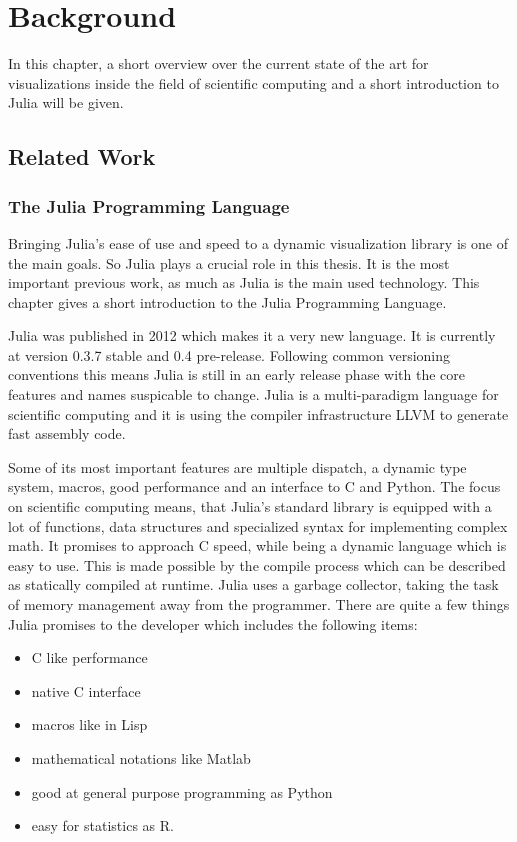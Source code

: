 \section{Background}

In this chapter, a short overview over the current state of the art for visualizations inside the field of scientific computing and a short introduction to Julia will be given.

\subsection{Related Work}

\subsubsection{The Julia Programming Language}

Bringing Julia's ease of use and speed to a dynamic visualization library is one of the main goals.
So Julia plays a crucial role in this thesis. 
It is the most important previous work, as much as Julia is the main used technology.
This chapter gives a short introduction to the Julia Programming Language.

Julia was published in 2012 which makes it a very new language. It is currently at version 0.3.7 stable and 0.4 pre-release.
Following common versioning conventions this means Julia is still in an early release phase with the core features and names suspicable to change.
Julia is a multi-paradigm language for scientific computing and it is using the compiler infrastructure \ac{LLVM} to generate fast assembly code.

Some of its most important features are multiple dispatch, a dynamic type system, macros, good performance and an interface to C and Python.
The focus on scientific computing means, that Julia's standard library is equipped with a lot of functions, data structures and specialized syntax for implementing complex math.
It promises to approach C speed, while being a dynamic language which is easy to use.
This is made possible by the compile process which can be described as statically compiled at runtime.
Julia uses a garbage collector, taking the task of memory management away from the programmer.
There are quite a few things Julia promises to the developer which includes the following items\cite{WhyJulia}:

\begin{itemize}
	\item C like performance
	\item native C interface
	\item macros like in Lisp
	\item mathematical notations like Matlab
	\item good at general purpose programming as Python
	\item easy for statistics as R.
\end{itemize}

